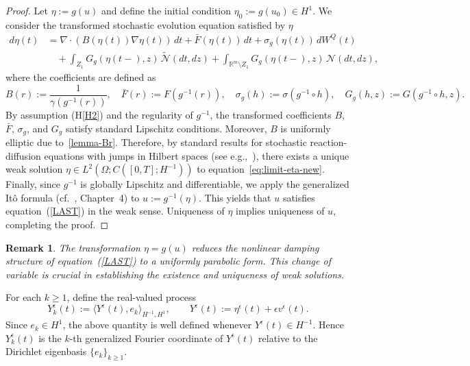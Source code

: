 \documentclass[11pt]{article}
\theoremstyle{plain}
\newtheorem{remark}[theorem]{Remark}
\numberwithin{equation}{section}
\begin{document}
\begin{proof}
 Let $\eta := g(u)$ and define the initial condition $\eta_0 := g(u_0) \in H^1$. 
We consider the transformed stochastic evolution equation satisfied by $\eta$
\begin{align}\label{eq:limit-eta-new}
d\eta(t) &= \nabla \cdot \left( B(\eta(t)) \nabla \eta(t) \right)\,dt 
+ \bar{F}(\eta(t))\,dt 
+ \sigma_g(\eta(t))\,dW^Q(t) \nonumber\\
&\quad + \int_{Z_1} G_g(\eta(t{-}), z)\,\tilde{{\mathcal N}}(dt,dz) 
+ \int_{\mathbb{R}^m \setminus Z_1} G_g(\eta(t{-}), z)\,{\mathcal N}(dt,dz),
\end{align}
where the coefficients are defined as
\[
B(r) := \frac{1}{\gamma(g^{-1}(r))}, \quad \bar{F}(r) := F(g^{-1}(r)), \quad \sigma_g(h) := \sigma(g^{-1} \circ h), \quad  G_g(h,z) := G(g^{-1} \circ h, z).
\]
\medskip\noindent
By assumption \textnormal{(H\ref{H2})} and the regularity of $g^{-1}$, the transformed coefficients $B$, $\bar{F}$, $\sigma_g$, and $G_g$ satisfy standard Lipschitz conditions. Moreover, $B$ is uniformly elliptic due to~\eqref{lemma-Br}. Therefore, by standard results for stochastic reaction-diffusion equations with jumps in Hilbert spaces (see e.g.,~\cite[Chapter~8]{peszat}), there exists a unique weak solution $\eta \in L^2(\Omega; C([0,T]; H^{-1}))$ to equation~\eqref{eq:limit-eta-new}.
Finally, since $g^{-1}$ is globally Lipschitz and differentiable, we apply the generalized Itô formula (cf.~\cite{peszat}, Chapter~4) to $u := g^{-1}(\eta)$. This yields that $u$ satisfies equation~(\ref{LAST}) in the weak sense. Uniqueness of $\eta$ implies uniqueness of $u$, completing the proof.
\end{proof}


 

\begin{remark}
The transformation $\eta = g(u)$ reduces the nonlinear damping structure of equation~(\ref{LAST}) to a uniformly parabolic form. This change of variable is crucial in establishing the existence and uniqueness of weak solutions.
\end{remark}

For each \(k\ge1\), define the real-valued process
\[
Y_k^\epsilon(t):=\langle Y^\epsilon(t),e_k\rangle_{H^{-1},H^1},\qquad Y^\epsilon(t):=\eta^\epsilon(t)+\epsilon v^\epsilon(t).
\]
Since \(e_k\in H^1\), the above quantity is well defined whenever \(Y^\epsilon(t)\in H^{-1}\). Hence \(Y_k^\epsilon(t)\) is the \(k\)-th
generalized Fourier coordinate of \(Y^\epsilon(t)\) relative to the Dirichlet eigenbasis \(\{e_k\}_{k\ge1}\).
\end{document}
